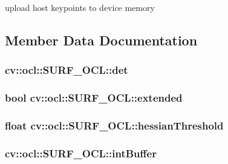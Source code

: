 upload host keypoints to device memory 



\subsection{Member Data Documentation}
\hypertarget{classcv_1_1ocl_1_1SURF__OCL_a1f4ebd553574b5add58fe75539e29502}{
\subsubsection[{det}]{ cv\-::ocl\-::\-S\-U\-R\-F\-\_\-\-O\-C\-L\-::det}}\label{classcv_1_1ocl_1_1SURF__OCL_a1f4ebd553574b5add58fe75539e29502}
\hypertarget{classcv_1_1ocl_1_1SURF__OCL_a80d15ad07a11261a87fcc57a5ae1a183}{
\subsubsection[{extended}]{\setlength{\rightskip}{0pt plus 5cm}bool cv\-::ocl\-::\-S\-U\-R\-F\-\_\-\-O\-C\-L\-::extended}}\label{classcv_1_1ocl_1_1SURF__OCL_a80d15ad07a11261a87fcc57a5ae1a183}
\hypertarget{classcv_1_1ocl_1_1SURF__OCL_aae1213f3be9a95a42dbcc0df047b8c00}{
\subsubsection[{hessian\-Threshold}]{\setlength{\rightskip}{0pt plus 5cm}float cv\-::ocl\-::\-S\-U\-R\-F\-\_\-\-O\-C\-L\-::hessian\-Threshold}}\label{classcv_1_1ocl_1_1SURF__OCL_aae1213f3be9a95a42dbcc0df047b8c00}
\hypertarget{classcv_1_1ocl_1_1SURF__OCL_ae00b2e62267a2a189d0dda909b41dfda}{
\subsubsection[{int\-Buffer}]{ cv\-::ocl\-::\-S\-U\-R\-F\-\_\-\-O\-C\-L\-::int\-Buffer}}\label{classcv_1_1ocl_1_1SURF__OCL_ae00b2e62267a2a189d0dda909b41dfda}
